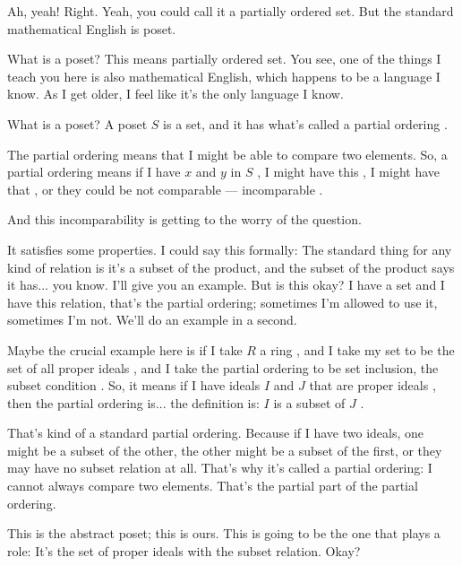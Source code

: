 \begin{speech}[00:27:04 - 00:28:38]
Ah, yeah! Right. Yeah, you could call it a partially ordered set. But the standard mathematical English is poset.

What is a poset?  This means partially ordered set. You see, one of the things I teach you here is also mathematical English, which happens to be a language I know. As I get older, I feel like it's the only language I know. 

What is a poset? A poset $S$ is a set, and it has what's called a partial ordering .

The partial ordering means that I might be able to compare two elements. So, a partial ordering means if I have $x$ and $y$ in $S$ , I might have this , I might have that , or they could be not comparable  --- incomparable .

And this incomparability is getting to the worry of the question.

It satisfies some properties. I could say this formally: The standard thing for any kind of relation is it's a subset of the product, and the subset of the product says it has... you know. I'll give you an example. But is this okay? I have a set and I have this relation, that's the partial ordering; sometimes I'm allowed to use it, sometimes I'm not. We'll do an example in a second.
\end{speech}

\begin{speech}[00:28:38 - 00:29:58]
Maybe the crucial example here is if I take $R$ a ring , and I take my set to be the set of all proper ideals , and I take the partial ordering to be set inclusion, the subset condition . So, it means if I have ideals $I$ and $J$ that are proper ideals , then the partial ordering is... the definition is: $I$ is a subset of $J$ .

That's kind of a standard partial ordering. Because if I have two ideals, one might be a subset of the other, the other might be a subset of the first, or they may have no subset relation at all. That's why it's called a partial ordering: I cannot always compare two elements. That's the partial part of the partial ordering.

This is the abstract poset; this is ours. This is going to be the one that plays a role: It's the set of proper ideals with the subset relation. Okay?
\end{speech}

